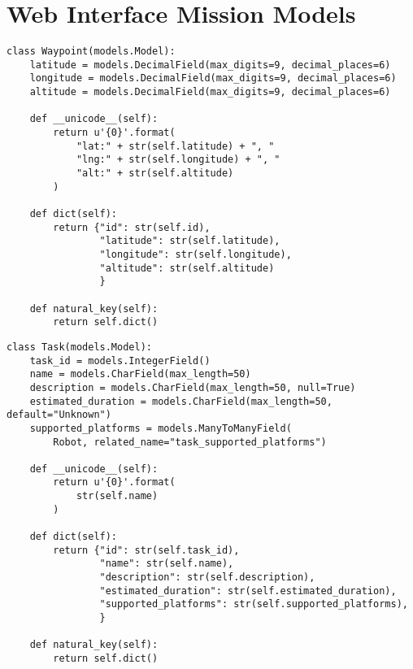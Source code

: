 \chapter{Web Interface Mission Models}
\pagestyle{cameron}

\begin{lstlisting}[style=custompython]
class Waypoint(models.Model):
    latitude = models.DecimalField(max_digits=9, decimal_places=6)
    longitude = models.DecimalField(max_digits=9, decimal_places=6)
    altitude = models.DecimalField(max_digits=9, decimal_places=6)

    def __unicode__(self):
        return u'{0}'.format(
            "lat:" + str(self.latitude) + ", "
            "lng:" + str(self.longitude) + ", "
            "alt:" + str(self.altitude)
        )

    def dict(self):
        return {"id": str(self.id),
                "latitude": str(self.latitude),
                "longitude": str(self.longitude),
                "altitude": str(self.altitude)
                }

    def natural_key(self):
        return self.dict()
\end{lstlisting}



\begin{lstlisting}[style=custompython]
class Task(models.Model):
    task_id = models.IntegerField()
    name = models.CharField(max_length=50)
    description = models.CharField(max_length=50, null=True)
    estimated_duration = models.CharField(max_length=50, default="Unknown")
    supported_platforms = models.ManyToManyField(
        Robot, related_name="task_supported_platforms")

    def __unicode__(self):
        return u'{0}'.format(
            str(self.name)
        )

    def dict(self):
        return {"id": str(self.task_id),
                "name": str(self.name),
                "description": str(self.description),
                "estimated_duration": str(self.estimated_duration),
                "supported_platforms": str(self.supported_platforms),
                }

    def natural_key(self):
        return self.dict()
\end{lstlisting}

